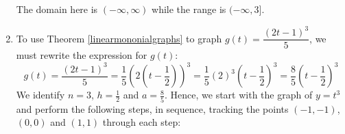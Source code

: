 \documentclass{ximera}
\begin{document}
\begin{example}
\begin{enumerate}

 



 



 
 
 The domain here is $(-\infty, \infty)$ while the range is $(-\infty, 3]$.
 
 \item To use Theorem \ref{linearmononialgraphs} to graph $g(t) = \dfrac{(2t-1)^3}{5}$, we must rewrite the expression for $g(t)$: \[ g(t) =  \dfrac{(2t-1)^3}{5} = \frac{1}{5} \left( 2 \left(t - \frac{1}{2} \right) \right)^3 = \frac{1}{5} (2)^3  \left( t - \frac{1}{2} \right)^3 = \frac{8}{5} \left( t - \frac{1}{2} \right)^3 \] We identify $n = 3$, $h = \frac{1}{2}$ and $a  = \frac{8}{5}$.  Hence, we start with the graph of $y = t^3$  and perform the following steps, in sequence, tracking the points $(-1,-1)$, $(0,0)$ and $(1,1)$ through each step:


\end{enumerate}
\end{example}
\end{document}
